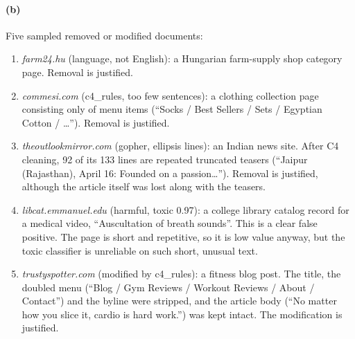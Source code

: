 \documentclass[11pt]{article}
\begin{document}
\paragraph{(b)} Five sampled removed or modified documents:
\begin{enumerate}
  \item \emph{farm24.hu} (language, not English): a Hungarian farm-supply shop category page. Removal is justified.
  \item \emph{commesi.com} (c4\_rules, too few sentences): a clothing collection page consisting only of menu items (``Socks / Best
  Sellers / Sets / Egyptian Cotton / \ldots''). Removal is justified.
  \item \emph{theoutlookmirror.com} (gopher, ellipsis lines): an Indian news site. After C4 cleaning, 92 of its 133 lines are
  repeated truncated teasers (``Jaipur (Rajasthan), April 16: Founded on a passion\ldots''). Removal is justified, although the
  article itself was lost along with the teasers.
  \item \emph{libcat.emmanuel.edu} (harmful, toxic 0.97): a college library catalog record for a medical video, ``Auscultation of
  breath sounds''. This is a clear false positive. The page is short and repetitive, so it is low value anyway, but the toxic
  classifier is unreliable on such short, unusual text.
  \item \emph{trustyspotter.com} (modified by c4\_rules): a fitness blog post. The title, the doubled menu (``Blog / Gym Reviews /
  Workout Reviews / About / Contact'') and the byline were stripped, and the article body (``No matter how you slice it, cardio is
  hard work.'') was kept intact. The modification is justified.
\end{enumerate}
\end{document}
